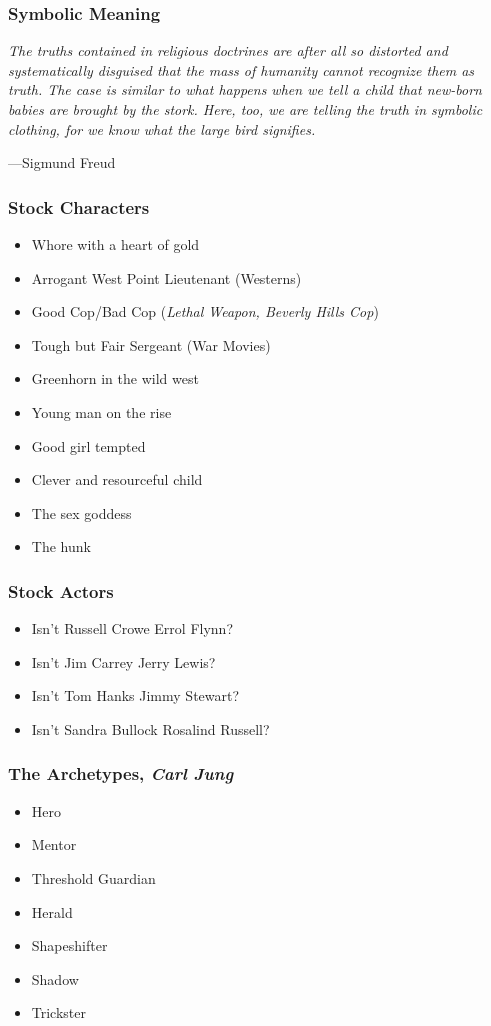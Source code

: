 \documentclass{beamer}
\newcommand{\bi}{\begin{itemize}}
\newcommand{\ei}{\end{itemize}}
\begin{document}
\begin{frame}\frametitle{Symbolic Meaning}
{\sf  \em
The truths contained in religious doctrines are after all so distorted
and systematically disguised that the mass of humanity cannot
recognize them as truth.  The case is similar to what happens when we
tell a child that new-born babies are brought by the stork.  Here,
too, we are telling the truth in symbolic clothing, for we know what
the large bird signifies.

\hfill ---Sigmund Freud
}

\end{frame}
\begin{frame}\frametitle{Stock Characters}

\bi
\item Whore with a heart of gold
\item Arrogant West Point Lieutenant (Westerns)
\item Good Cop/Bad Cop ({\em Lethal Weapon, Beverly Hills Cop})
\item Tough but Fair Sergeant (War Movies)
\item Greenhorn in the wild west
\item Young man on the rise
\item Good girl tempted
\item Clever and resourceful child
\item The sex goddess
\item The hunk
\ei

\end{frame}
\begin{frame}\frametitle{Stock Actors}
\bi
\item Isn't Russell Crowe  Errol Flynn?
\item Isn't Jim Carrey  Jerry Lewis?
\item Isn't Tom Hanks  Jimmy Stewart?
\item Isn't Sandra Bullock  Rosalind Russell?
\ei


\end{frame}
\begin{frame}\frametitle{The Archetypes, \em Carl Jung}

\bi
\item Hero
\item Mentor
\item Threshold Guardian
\item Herald
\item Shapeshifter
\item Shadow
\item Trickster
\ei

\end{frame}
\end{document}
